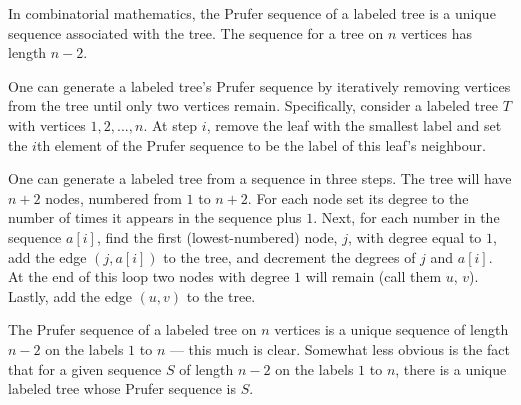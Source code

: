 
In combinatorial mathematics, the Prufer sequence of a labeled tree is a unique sequence associated with the tree. The sequence for a tree on $n$ vertices has length $n-2$.

One can generate a labeled tree's Prufer sequence by iteratively removing vertices from the tree until only two vertices remain. Specifically, consider a labeled tree $T$ with vertices ${1, 2, ..., n}$. At step $i$, remove the leaf with the smallest label and set the $i$th element of the Prufer sequence to be the label of this leaf's neighbour.

One can generate a labeled tree from a sequence in three steps. The tree will have $n+2$ nodes, numbered from $1$ to $n+2$. For each node set its degree to the number of times it appears in the sequence plus $1$. Next, for each number in the sequence $a[i]$, find the first (lowest-numbered) node, $j$, with degree equal to $1$, add the edge $(j, a[i])$ to the tree, and decrement the degrees of $j$ and $a[i]$. At the end of this loop two nodes with degree $1$ will remain (call them $u$, $v$). Lastly, add the edge $(u,v)$ to the tree.

The Prufer sequence of a labeled tree on $n$ vertices is a unique sequence of length $n-2$ on the labels $1$ to $n$ — this much is clear. Somewhat less obvious is the fact that for a given sequence $S$ of length $n-2$ on the labels $1$ to $n$, there is a unique labeled tree whose Prufer sequence is $S$.

